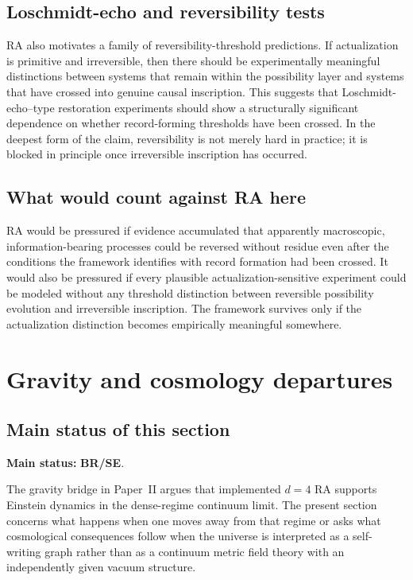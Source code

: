 \documentclass[11pt]{article}
\begin{document}
\subsection{Loschmidt-echo and reversibility tests}
RA also motivates a family of reversibility-threshold predictions. If actualization is primitive and irreversible, then there should be experimentally meaningful distinctions between systems that remain within the possibility layer and systems that have crossed into genuine causal inscription. This suggests that Loschmidt-echo–type restoration experiments should show a structurally significant dependence on whether record-forming thresholds have been crossed. In the deepest form of the claim, reversibility is not merely hard in practice; it is blocked in principle once irreversible inscription has occurred.

\subsection{What would count against RA here}
RA would be pressured if evidence accumulated that apparently macroscopic, information-bearing processes could be reversed without residue even after the conditions the framework identifies with record formation had been crossed. It would also be pressured if every plausible actualization-sensitive experiment could be modeled without any threshold distinction between reversible possibility evolution and irreversible inscription. The framework survives only if the actualization distinction becomes empirically meaningful somewhere.

\section{Gravity and cosmology departures}\label{sec:gravity-cosmology}
\subsection{Main status of this section}
\textbf{Main status:} \textbf{BR/SE}.

The gravity bridge in Paper~II argues that implemented $d=4$ RA supports Einstein dynamics in the dense-regime continuum limit. The present section concerns what happens when one moves away from that regime or asks what cosmological consequences follow when the universe is interpreted as a self-writing graph rather than as a continuum metric field theory with an independently given vacuum structure.
\end{document}
